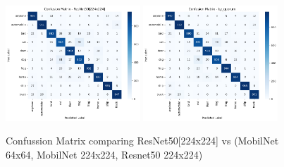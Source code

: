 \documentclass{cpsc202}
\begin{document}
    \begin{figure}[h]
        \caption{Confussion Matrix comparing ResNet50[224x224] vs (MobilNet 64x64, MobilNet 224x224, Resnet50 224x224)}
        \centering
        \includegraphics[width=0.45\textwidth]{confusion_matrix_resnet50}
        \includegraphics[width=0.45\textwidth]{confusion_matrix_by_quorum}
        \label{fig:confussion_matrix_quorum}
    \end{figure}
\end{document}
